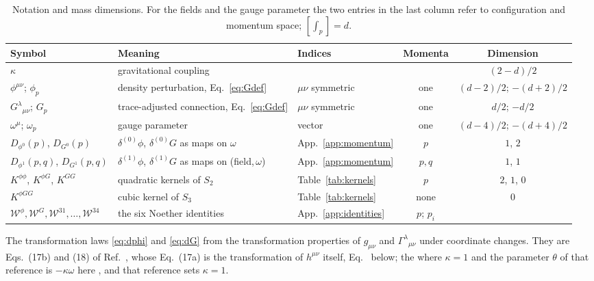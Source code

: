 \documentclass[prd,aps,preprint,superscriptaddress,nofootinbib,amsmath,amssymb,eqsecnum]{revtex4-2}
\newcommand{\W}{\mathcal{W}}
\newcommand{\ip}[1]{\int_{#1}}
\providecommand{\DIFaddtex}[1]{{\protect\color{blue} \sf #1}} %
\providecommand{\DIFdeltex}[1]{{\protect\color{red} \scriptsize #1}} %
\providecommand{\DIFaddbegin}{} %
\providecommand{\DIFaddend}{} %
\providecommand{\DIFdelbegin}{} %
\providecommand{\DIFdelend}{} %
\providecommand{\DIFaddFL}[1]{\DIFadd{#1}} %
\providecommand{\DIFadd}[1]{\texorpdfstring{\DIFaddtex{#1}}{#1}} %
\providecommand{\DIFdel}[1]{\texorpdfstring{\DIFdeltex{#1}}{}} %
\begin{document}
\begin{table}[htb]
\centering\scriptsize
\begin{tabular}{@{}lllcc@{}}
\toprule
\DIFaddFL{Symbol }& \DIFaddFL{Meaning }& \DIFaddFL{Indices }& \DIFaddFL{Momenta }& \DIFaddFL{Dimension }\\
\midrule
\DIFaddFL{$\kappa$ }& \DIFaddFL{gravitational coupling }& & & \DIFaddFL{$(2-d)/2$ }\\
\DIFaddFL{$\phi^{\mu\nu}$; $\phi_p$ }& \DIFaddFL{density perturbation, Eq.~}\eqref{eq:Gdef} & \DIFaddFL{$\mu\nu$ symmetric }& \DIFaddFL{one }& \DIFaddFL{$(d-2)/2$; $-(d+2)/2$ }\\
\DIFaddFL{$G^{\lambda}{}_{\mu\nu}$; $G_p$ }& \DIFaddFL{trace-adjusted connection, Eq.~}\eqref{eq:Gdef} & \DIFaddFL{$\mu\nu$ symmetric }& \DIFaddFL{one }& \DIFaddFL{$d/2$; $-d/2$ }\\
\DIFaddFL{$\omega^{\mu}$; $\omega_p$ }& \DIFaddFL{gauge parameter }& \DIFaddFL{vector }& \DIFaddFL{one }& \DIFaddFL{$(d-4)/2$; $-(d+4)/2$ }\\
\DIFaddFL{$D_{\phi^0}(p)$, $D_{G^0}(p)$ }& \DIFaddFL{$\delta^{(0)}\phi$, $\delta^{(0)}G$ as maps on $\omega$ }& \DIFaddFL{App.~\ref{app:momentum} }& \DIFaddFL{$p$ }& \DIFaddFL{$1$, $2$ }\\
\DIFaddFL{$D_{\phi^1}(p,q)$, $D_{G^1}(p,q)$ }& \DIFaddFL{$\delta^{(1)}\phi$, $\delta^{(1)}G$ as maps on (field,\,$\omega$) }& \DIFaddFL{App.~\ref{app:momentum} }& \DIFaddFL{$p,q$ }& \DIFaddFL{$1$, $1$ }\\
\DIFaddFL{$K^{\phi\phi}$, $K^{\phi G}$, $K^{GG}$ }& \DIFaddFL{quadratic kernels of $S_2$ }& \DIFaddFL{Table~\ref{tab:kernels} }& \DIFaddFL{$p$ }& \DIFaddFL{$2$, $1$, $0$ }\\
\DIFaddFL{$K^{\phi GG}$ }& \DIFaddFL{cubic kernel of $S_3$ }& \DIFaddFL{Table~\ref{tab:kernels} }& \DIFaddFL{none }& \DIFaddFL{$0$ }\\
\DIFaddFL{$\W^{\phi},\W^{G},\W^{31},\dots,\W^{34}$ }& \DIFaddFL{the six Noether identities }& \DIFaddFL{App.~\ref{app:identities} }& \DIFaddFL{$p$; $p_i$ }& \\
\bottomrule
\end{tabular}
\caption{\DIFaddFL{Notation and mass dimensions. For the fields and the gauge parameter the two entries
in the last column refer to configuration and momentum space; $[\ip{p}]=d$.}}
\label{tab:notation}
\end{table}

\DIFadd{The transformation laws }\DIFaddend \eqref{eq:dphi} and \eqref{eq:dG} \DIFdelbegin \DIFdel{from the transformation
properties of $g_{\mu\nu}$ and $\Gamma^{\lambda}{}_{\mu\nu}$ under coordinate changes. They }\DIFdelend are Eqs.~(17b) and (18) of
Ref.~\cite{BrandtMcKeon2015}, \DIFdelbegin \DIFdel{whose Eq.~(17a) is the transformation of $h^{\mu\nu}$ itself,
Eq.~}%
\DIFdel{below; the }\DIFdelend \DIFaddbegin \DIFadd{where $\kappa=1$ and the }\DIFaddend parameter $\theta$ \DIFdelbegin \DIFdel{of that reference }\DIFdelend is $-\kappa\omega$
here\DIFdelbegin \DIFdel{, and
that reference sets $\kappa=1$. }%
\end{document}
